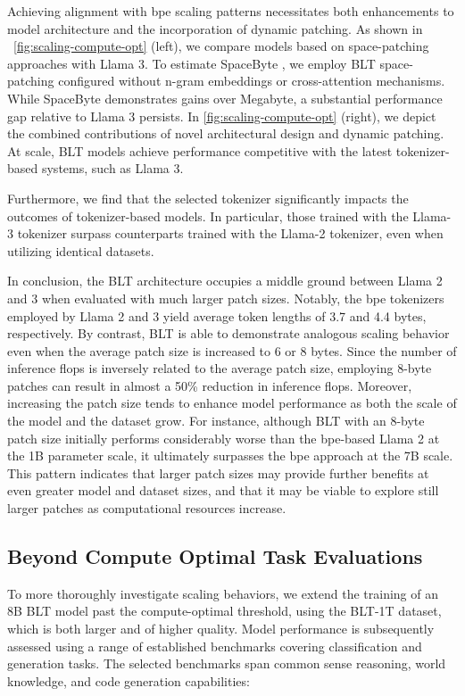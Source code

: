 Achieving alignment with bpe scaling patterns necessitates both enhancements to model architecture and the incorporation of dynamic patching. As shown in ~\autoref{fig:scaling-compute-opt} (left), we compare models based on space-patching approaches with Llama 3. To estimate SpaceByte \citep{slagle2024spacebyte}, we employ {\textsc BLT} space-patching configured without n-gram embeddings or cross-attention mechanisms. While SpaceByte demonstrates gains over Megabyte, a substantial performance gap relative to Llama 3 persists. In \autoref{fig:scaling-compute-opt} (right), we depict the combined contributions of novel architectural design and dynamic patching. At scale, {\textsc BLT} models achieve performance competitive with the latest tokenizer-based systems, such as Llama 3.

Furthermore, we find that the selected tokenizer significantly impacts the outcomes of tokenizer-based models. In particular, those trained with the Llama-3 tokenizer surpass counterparts trained with the Llama-2 tokenizer, even when utilizing identical datasets.

In conclusion, the {\textsc BLT} architecture occupies a middle ground between Llama 2 and 3 when evaluated with much larger patch sizes. Notably, the bpe tokenizers employed by Llama 2 and 3 yield average token lengths of 3.7 and 4.4 bytes, respectively. By contrast, {\textsc BLT} is able to demonstrate analogous scaling behavior even when the average patch size is increased to 6 or 8 bytes. Since the number of inference flops is inversely related to the average patch size, employing 8-byte patches can result in almost a 50\% reduction in inference flops. Moreover, increasing the patch size tends to enhance model performance as both the scale of the model and the dataset grow. For instance, although {\textsc BLT} with an 8-byte patch size initially performs considerably worse than the bpe-based Llama 2 at the 1B parameter scale, it ultimately surpasses the bpe approach at the 7B scale. This pattern indicates that larger patch sizes may provide further benefits at even greater model and dataset sizes, and that it may be viable to explore still larger patches as computational resources increase.

\subsection{Beyond Compute Optimal Task Evaluations}
\label{section:evals}
To more thoroughly investigate scaling behaviors, we extend the training of an 8B {\textsc BLT} model past the compute-optimal threshold, using the {\textsc BLT}-1T dataset, which is both larger and of higher quality. Model performance is subsequently assessed using a range of established benchmarks covering classification and generation tasks. The selected benchmarks span common sense reasoning, world knowledge, and code generation capabilities:
